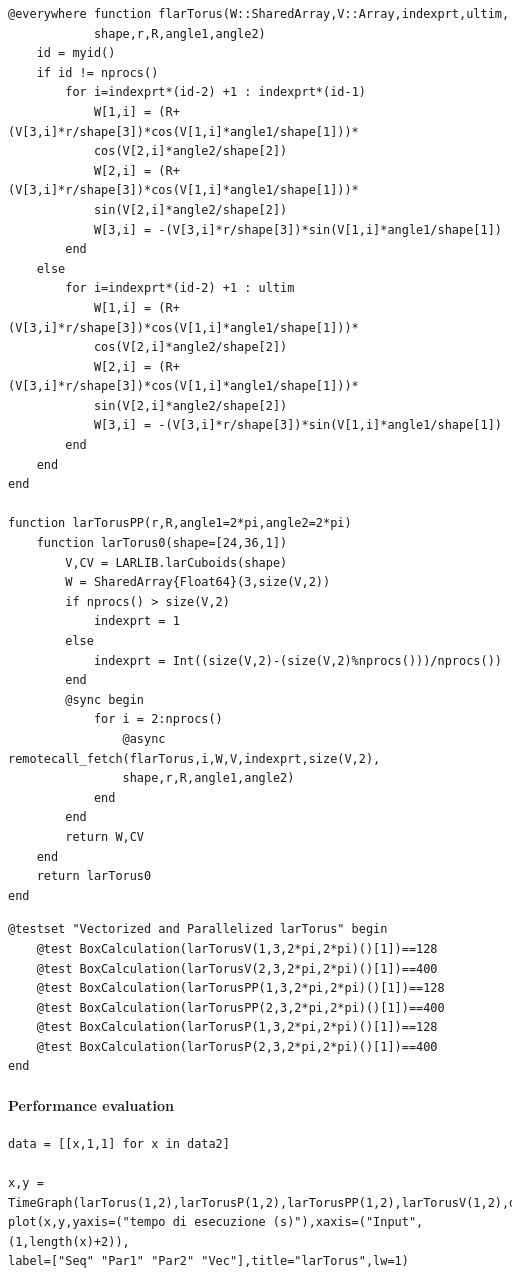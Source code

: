 \documentclass{article}
\begin{document}
\begin{Verbatim}
@everywhere function flarTorus(W::SharedArray,V::Array,indexprt,ultim,
            shape,r,R,angle1,angle2)
    id = myid()
    if id != nprocs()
        for i=indexprt*(id-2) +1 : indexprt*(id-1)
            W[1,i] = (R+(V[3,i]*r/shape[3])*cos(V[1,i]*angle1/shape[1]))*
            cos(V[2,i]*angle2/shape[2])       
            W[2,i] = (R+(V[3,i]*r/shape[3])*cos(V[1,i]*angle1/shape[1]))*
            sin(V[2,i]*angle2/shape[2])
            W[3,i] = -(V[3,i]*r/shape[3])*sin(V[1,i]*angle1/shape[1])
        end
    else
        for i=indexprt*(id-2) +1 : ultim
            W[1,i] = (R+(V[3,i]*r/shape[3])*cos(V[1,i]*angle1/shape[1]))*
            cos(V[2,i]*angle2/shape[2])       
            W[2,i] = (R+(V[3,i]*r/shape[3])*cos(V[1,i]*angle1/shape[1]))*
            sin(V[2,i]*angle2/shape[2])
            W[3,i] = -(V[3,i]*r/shape[3])*sin(V[1,i]*angle1/shape[1])
        end
    end
end

function larTorusPP(r,R,angle1=2*pi,angle2=2*pi)
    function larTorus0(shape=[24,36,1])
        V,CV = LARLIB.larCuboids(shape)
        W = SharedArray{Float64}(3,size(V,2))           
        if nprocs() > size(V,2)
            indexprt = 1
        else
            indexprt = Int((size(V,2)-(size(V,2)%nprocs()))/nprocs())
        end
        @sync begin
            for i = 2:nprocs()
                @async remotecall_fetch(flarTorus,i,W,V,indexprt,size(V,2),
                shape,r,R,angle1,angle2)
            end
        end
        return W,CV
    end
    return larTorus0
end 
\end{Verbatim}

\begin{Verbatim}
@testset "Vectorized and Parallelized larTorus" begin
    @test BoxCalculation(larTorusV(1,3,2*pi,2*pi)()[1])==128
    @test BoxCalculation(larTorusV(2,3,2*pi,2*pi)()[1])==400
    @test BoxCalculation(larTorusPP(1,3,2*pi,2*pi)()[1])==128
    @test BoxCalculation(larTorusPP(2,3,2*pi,2*pi)()[1])==400
    @test BoxCalculation(larTorusP(1,3,2*pi,2*pi)()[1])==128
    @test BoxCalculation(larTorusP(2,3,2*pi,2*pi)()[1])==400
end
\end{Verbatim}

\paragraph{Performance evaluation}

\begin{Verbatim}
data = [[x,1,1] for x in data2]

x,y = TimeGraph(larTorus(1,2),larTorusP(1,2),larTorusPP(1,2),larTorusV(1,2),data,5)
plot(x,y,yaxis=("tempo di esecuzione (s)"),xaxis=("Input",(1,length(x)+2)),
label=["Seq" "Par1" "Par2" "Vec"],title="larTorus",lw=1)

\end{Verbatim}
\end{document}
